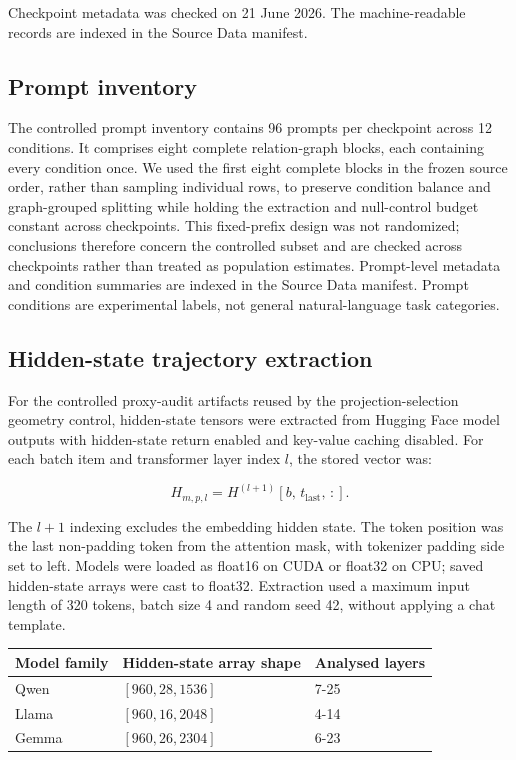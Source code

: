 \documentclass[11pt]{article}
\begin{document}
Checkpoint metadata was checked on 21 June 2026. The machine-readable records are indexed in the Source Data manifest.

\subsection*{Prompt inventory}
The controlled prompt inventory contains 96 prompts per checkpoint across 12 conditions. It comprises eight complete relation-graph blocks, each containing every condition once. We used the first eight complete blocks in the frozen source order, rather than sampling individual rows, to preserve condition balance and graph-grouped splitting while holding the extraction and null-control budget constant across checkpoints. This fixed-prefix design was not randomized; conclusions therefore concern the controlled subset and are checked across checkpoints rather than treated as population estimates. Prompt-level metadata and condition summaries are indexed in the Source Data manifest. Prompt conditions are experimental labels, not general natural-language task categories.

\subsection*{Hidden-state trajectory extraction}
For the controlled proxy-audit artifacts reused by the projection-selection geometry control, hidden-state tensors were extracted from Hugging Face model outputs with hidden-state return enabled and key-value caching disabled. For each batch item and transformer layer index \(l\), the stored vector was:

\begin{equation*}
H_{m,p,l}=H^{(l+1)}\!\left[b,\,t_{\mathrm{last}},\,:\right].
\end{equation*}

The \(l+1\) indexing excludes the embedding hidden state. The token position was the last non-padding token from the attention mask, with tokenizer padding side set to left. Models were loaded as float16 on CUDA or float32 on CPU; saved hidden-state arrays were cast to float32. Extraction used a maximum input length of 320 tokens, batch size 4 and random seed 42, without applying a chat template.

\begin{table}[H]
\centering\scriptsize\sloppy
\begin{tabularx}{\textwidth}{@{}XXX@{}}
\toprule
Model family & Hidden-state array shape & Analysed layers \\
\midrule
Qwen & \([960,28,1536]\) & 7-25 \\
Llama & \([960,16,2048]\) & 4-14 \\
Gemma & \([960,26,2304]\) & 6-23 \\
\bottomrule
\end{tabularx}
\end{table}
\end{document}
